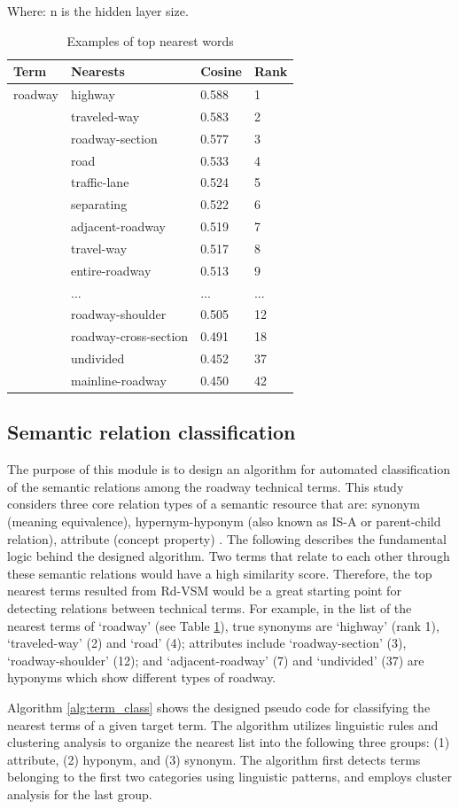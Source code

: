 \documentclass[Journal, BackFigs,NoLists, DoubleSpace]{ascelike}%
\begin{document}
Where: n is the hidden layer size.
%
\begin{table} [t]
	\caption{Examples of top nearest words}
	\label{table:nearest_example}
	\centering
	\small
	\renewcommand{\arraystretch}{1.25}
	\begin{tabular}{l l l  l}
		\hline
		\textbf{Term} & \textbf{Nearests} & \textbf{Cosine} &\textbf{Rank}\\
		\hline
		roadway			& highway & 0.588 & 1\\
		& traveled-way & 0.583 & 2\\
		& roadway-section & 0.577 & 3\\
		& road & 0.533 & 4\\
		& traffic-lane & 0.524 &5\\
		& separating & 0.522 &6\\
		& adjacent-roadway & 0.519 & 7\\
		& travel-way & 0.517 & 8\\
		& entire-roadway & 0.513 & 9\\
		& ...&...& ...\\
		& roadway-shoulder & 0.505 & 12\\
		& roadway-cross-section & 0.491 & 18\\
		& undivided & 0.452 & 37\\
		& mainline-roadway & 0.450 & 42\\
		\hline
	\end{tabular}
	\normalsize
\end{table}

\subsection{Semantic relation classification}
The purpose of this module is to design an algorithm for automated classification of the semantic relations among the roadway technical terms. This study considers three core relation types of a semantic resource that are: synonym (meaning equivalence), hypernym-hyponym (also known as IS-A or parent-child relation), attribute (concept property) \cite{jiang1997semantic,lee13}. The following describes the fundamental logic behind the designed algorithm. Two terms that relate to each other through these semantic relations would have a high similarity score. Therefore, the top nearest terms resulted from Rd-VSM would be a great starting point for detecting relations between technical terms. For example, in the list of the nearest terms of `roadway' (see Table \ref{table:nearest_example}), true synonyms are `highway' (rank 1), `traveled-way' (2) and `road' (4); attributes include `roadway-section' (3), `roadway-shoulder' (12); and `adjacent-roadway' (7) and `undivided' (37) are hyponyms which show different types of roadway.
\par
Algorithm \ref{alg:term_class} shows the designed pseudo code for classifying the nearest terms of a given target term. The algorithm utilizes linguistic rules and clustering analysis to organize the nearest list into the following three groups: (1) attribute, (2) hyponym, and (3) synonym. The algorithm first detects terms belonging to the first two categories using linguistic patterns, and employs cluster analysis for the last group.
%
\end{document}

